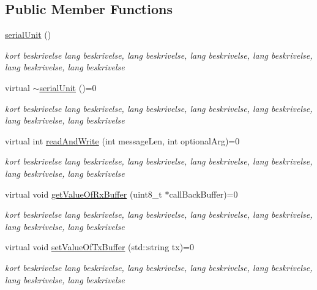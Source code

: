 \subsection*{Public Member Functions}
\begin{DoxyCompactItemize}
\item 
\hyperlink{classserialUnit_af26f4292b42cd782520962aebc9d708e}{serial\+Unit} ()
\begin{DoxyCompactList}\small\item\em kort beskrivelse lang beskrivelse, lang beskrivelse, lang beskrivelse, lang beskrivelse, lang beskrivelse, lang beskrivelse \end{DoxyCompactList}\item 
virtual \hyperlink{classserialUnit_a1e6211e2fe4b241d3f2e2dc116435b7d}{$\sim$serial\+Unit} ()=0
\begin{DoxyCompactList}\small\item\em kort beskrivelse lang beskrivelse, lang beskrivelse, lang beskrivelse, lang beskrivelse, lang beskrivelse, lang beskrivelse \end{DoxyCompactList}\item 
virtual int \hyperlink{classserialUnit_a5d5573f6d367d8e191df6b8044a81a62}{read\+And\+Write} (int message\+Len, int optional\+Arg)=0
\begin{DoxyCompactList}\small\item\em kort beskrivelse lang beskrivelse, lang beskrivelse, lang beskrivelse, lang beskrivelse, lang beskrivelse, lang beskrivelse \end{DoxyCompactList}\item 
virtual void \hyperlink{classserialUnit_a88db4b94632c6ab70933bb32f105821d}{get\+Value\+Of\+Rx\+Buffer} (uint8\+\_\+t $\ast$call\+Back\+Buffer)=0
\begin{DoxyCompactList}\small\item\em kort beskrivelse lang beskrivelse, lang beskrivelse, lang beskrivelse, lang beskrivelse, lang beskrivelse, lang beskrivelse \end{DoxyCompactList}\item 
virtual void \hyperlink{classserialUnit_a759db776a18c097ce85652d41d46b943}{set\+Value\+Of\+Tx\+Buffer} (std\+::string tx)=0
\begin{DoxyCompactList}\small\item\em kort beskrivelse lang beskrivelse, lang beskrivelse, lang beskrivelse, lang beskrivelse, lang beskrivelse, lang beskrivelse \end{DoxyCompactList}\item 

\end{DoxyCompactItemize}
